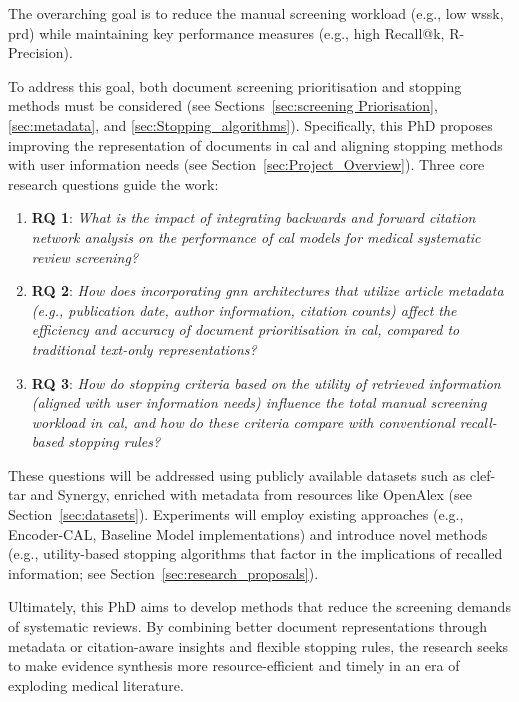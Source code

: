 \documentclass[10pt,oneside]{book}
\begin{document}
The overarching goal is to reduce the manual screening workload (e.g., low \gls*{wssk}, \gls*{prd}) while maintaining key performance measures (e.g., high Recall@k, R-Precision).

To address this goal, both document screening prioritisation and stopping methods must be considered (see Sections~\ref{sec:screening Priorisation}, \ref{sec:metadata}, and \ref{sec:Stopping_algorithms}). Specifically, this PhD proposes improving the representation of documents in \gls*{cal} and aligning stopping methods with user information needs (see Section~\ref{sec:Project_Overview}). Three core research questions guide the work:

\begin{enumerate} 

\item \textbf{RQ 1}: \emph{What is the impact of integrating backwards and forward citation network analysis on the performance of \gls*{cal} models for medical systematic review screening?}
\item \textbf{RQ 2}: \emph{How does incorporating \gls*{gnn} architectures that utilize article metadata (e.g., publication date, author information, citation counts) affect the efficiency and accuracy of document prioritisation in \gls*{cal}, compared to traditional text-only representations?}
\item \textbf{RQ 3}: \emph{How do stopping criteria based on the utility of retrieved information (aligned with user information needs) influence the total manual screening workload in \gls*{cal}, and how do these criteria compare with conventional recall-based stopping rules?}

\end{enumerate}

These questions will be addressed using publicly available datasets such as \gls*{clef}-\gls*{tar} and Synergy, enriched with metadata from resources like OpenAlex (see Section~\ref{sec:datasets}). Experiments will employ existing approaches (e.g., Encoder-CAL, Baseline Model implementations) and introduce novel methods (e.g., utility-based stopping algorithms that factor in the implications of recalled information; see Section~\ref{sec:research_proposals}).

Ultimately, this PhD aims to develop methods that reduce the screening demands of systematic reviews. By combining better document representations through metadata or citation-aware insights and flexible stopping rules, the research seeks to make evidence synthesis more resource-efficient and timely in an era of exploding medical literature.
\end{document}
